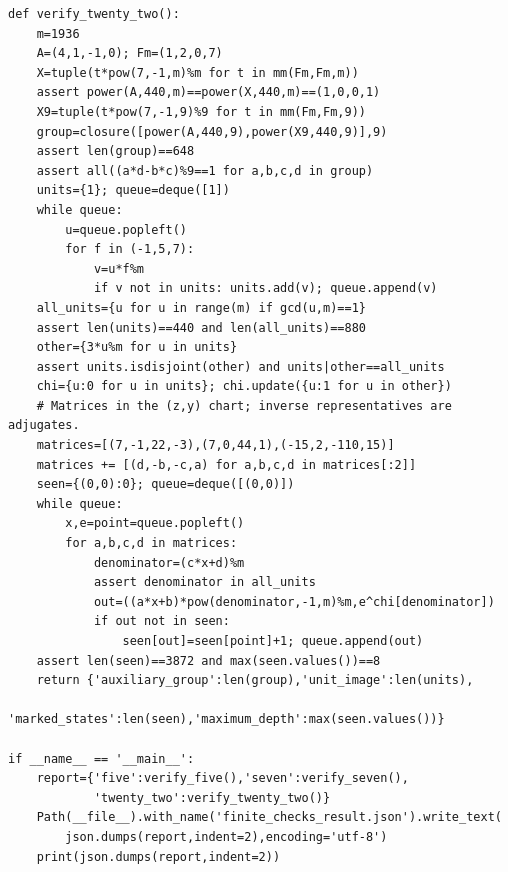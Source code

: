 \documentclass[11pt,a4paper]{article}
\theoremstyle{definition}
\numberwithin{equation}{section}
\begin{document}
\begin{Verbatim}[fontsize=\scriptsize]
def verify_twenty_two():
    m=1936
    A=(4,1,-1,0); Fm=(1,2,0,7)
    X=tuple(t*pow(7,-1,m)%m for t in mm(Fm,Fm,m))
    assert power(A,440,m)==power(X,440,m)==(1,0,0,1)
    X9=tuple(t*pow(7,-1,9)%9 for t in mm(Fm,Fm,9))
    group=closure([power(A,440,9),power(X9,440,9)],9)
    assert len(group)==648
    assert all((a*d-b*c)%9==1 for a,b,c,d in group)
    units={1}; queue=deque([1])
    while queue:
        u=queue.popleft()
        for f in (-1,5,7):
            v=u*f%m
            if v not in units: units.add(v); queue.append(v)
    all_units={u for u in range(m) if gcd(u,m)==1}
    assert len(units)==440 and len(all_units)==880
    other={3*u%m for u in units}
    assert units.isdisjoint(other) and units|other==all_units
    chi={u:0 for u in units}; chi.update({u:1 for u in other})
    # Matrices in the (z,y) chart; inverse representatives are adjugates.
    matrices=[(7,-1,22,-3),(7,0,44,1),(-15,2,-110,15)]
    matrices += [(d,-b,-c,a) for a,b,c,d in matrices[:2]]
    seen={(0,0):0}; queue=deque([(0,0)])
    while queue:
        x,e=point=queue.popleft()
        for a,b,c,d in matrices:
            denominator=(c*x+d)%m
            assert denominator in all_units
            out=((a*x+b)*pow(denominator,-1,m)%m,e^chi[denominator])
            if out not in seen:
                seen[out]=seen[point]+1; queue.append(out)
    assert len(seen)==3872 and max(seen.values())==8
    return {'auxiliary_group':len(group),'unit_image':len(units),
            'marked_states':len(seen),'maximum_depth':max(seen.values())}

if __name__ == '__main__':
    report={'five':verify_five(),'seven':verify_seven(),
            'twenty_two':verify_twenty_two()}
    Path(__file__).with_name('finite_checks_result.json').write_text(
        json.dumps(report,indent=2),encoding='utf-8')
    print(json.dumps(report,indent=2))

\end{Verbatim}
\end{document}
